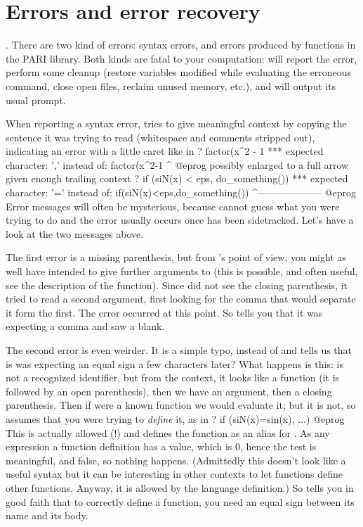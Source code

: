 \section{Errors and error recovery}

. There are two kind of errors: syntax errors, and errors
produced by functions in the PARI library. Both kinds are fatal to your
computation:  will report the error, perform some cleanup (restore
variables modified while evaluating the erroneous command, close open files,
reclaim unused memory, etc.), and will output its usual prompt.

When reporting a syntax error,  tries to give meaningful context by copying
the sentence it was trying to read (whitespace and comments stripped
out), indicating an error with a little caret like in
\bprog
? factor(x^2 - 1
  ***   expected character: ',' instead of: factor(x^2-1
                                                        ^
@eprog
\noindent possibly enlarged to a full arrow given enough trailing context
\bprog
? if (siN(x) < eps, do_something())
  ***   expected character: '=' instead of: if(siN(x)<eps,do_something())
                                                     ^--------------------
@eprog
\noindent
Error messages will often be mysterious, because  cannot guess what
you were trying to do and the error usually occurs once  has been
sidetracked. Let's have a look at the two messages above.

The first error is a missing parenthesis, but from 's point of view, you
might as well have intended to give further arguments to  (this is
possible, and often useful, see the description of the function). Since
did not see the closing parenthesis, it tried to read a second argument,
first looking for the comma that would separate it form the first. The error
occurred at this point. So  tells you that it was expecting a comma and saw
a blank.

The second error is even weirder. It is a simple typo,  instead of
 and  tells us that is was expecting an equal sign a few
characters later? What happens is this:  is not a recognized
identifier, but from the context, it looks like a function (it is followed by
an open parenthesis), then we have an argument, then a closing parenthesis.
Then if  were a known function we would evaluate it; but it is not,
so  assumes that you were trying to \emph{define} it, as in
\bprog
? if (siN(x)=sin(x), ...)
@eprog
This is actually allowed (!) and defines the function  as an alias for
. As any expression a function definition has a value, which is $0$,
hence the test is meaningful, and false, so nothing happens. (Admittedly this
doesn't look like a useful syntax but it can be interesting in other contexts
to let functions define other functions. Anyway, it is allowed by the
language definition.)  So  tells you in good faith that to correctly define
a function, you need an equal sign between its name and its body.

